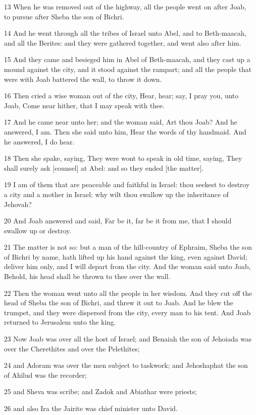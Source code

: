 \par 13 When he was removed out of the highway, all the people went on after Joab, to pursue after Sheba the son of Bichri.
\par 14 And he went through all the tribes of Israel unto Abel, and to Beth-maacah, and all the Berites: and they were gathered together, and went also after him.
\par 15 And they came and besieged him in Abel of Beth-maacah, and they cast up a mound against the city, and it stood against the rampart; and all the people that were with Joab battered the wall, to throw it down.
\par 16 Then cried a wise woman out of the city, Hear, hear; say, I pray you, unto Joab, Come near hither, that I may speak with thee.
\par 17 And he came near unto her; and the woman said, Art thou Joab? And he answered, I am. Then she said unto him, Hear the words of thy handmaid. And he answered, I do hear.
\par 18 Then she spake, saying, They were wont to speak in old time, saying, They shall surely ask [counsel] at Abel: and so they ended [the matter].
\par 19 I am of them that are peaceable and faithful in Israel: thou seekest to destroy a city and a mother in Israel: why wilt thou swallow up the inheritance of Jehovah?
\par 20 And Joab answered and said, Far be it, far be it from me, that I should swallow up or destroy.
\par 21 The matter is not so: but a man of the hill-country of Ephraim, Sheba the son of Bichri by name, hath lifted up his hand against the king, even against David; deliver him only, and I will depart from the city. And the woman said unto Joab, Behold, his head shall be thrown to thee over the wall.
\par 22 Then the woman went unto all the people in her wisdom. And they cut off the head of Sheba the son of Bichri, and threw it out to Joab. And he blew the trumpet, and they were dispersed from the city, every man to his tent. And Joab returned to Jerusalem unto the king.
\par 23 Now Joab was over all the host of Israel; and Benaiah the son of Jehoiada was over the Cherethites and over the Pelethites;
\par 24 and Adoram was over the men subject to taskwork; and Jehoshaphat the son of Ahilud was the recorder;
\par 25 and Sheva was scribe; and Zadok and Abiathar were priests;
\par 26 and also Ira the Jairite was chief minister unto David.

